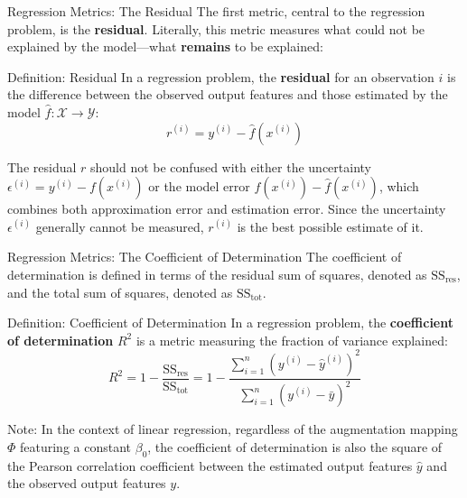 \begin{frame}{Regression Metrics: The Residual}
	The first metric, central to the regression problem, is the \textbf{residual}. Literally, this metric measures what could not be explained by the model—what \textbf{remains} to be explained:
	\begin{block}{Definition: Residual}
		In a regression problem, the \textbf{residual} for an observation $i$ is the difference between the observed output features and those estimated by the model $\hat{f}: \mathcal{X} \to \mathcal{Y}$:
		\begin{equation}
			r^{(i)} = y^{(i)} - \hat{f}(x^{(i)})
			\nonumber
		\end{equation}
	\end{block}
	\pause
	The residual $r$ should not be confused with either the uncertainty $\epsilon^{(i)} = y^{(i)} - f(x^{(i)})$ or the model error $f(x^{(i)}) - \hat{f}(x^{(i)})$, which combines both approximation error and estimation error. Since the uncertainty $\epsilon^{(i)}$ generally cannot be measured, $r^{(i)}$ is the best possible estimate of it.
\end{frame}

\begin{frame}{Regression Metrics: The Coefficient of Determination}
	The coefficient of determination is defined in terms of the residual sum of squares, denoted as $\text{SS}_{\text{res}}$, and the total sum of squares, denoted as $\text{SS}_{\text{tot}}$.
	\begin{block}{Definition: Coefficient of Determination}
		In a regression problem, the \textbf{coefficient of determination} $R^2$ is a metric measuring the fraction of variance explained:
		\begin{equation}
			R^2 = 1 - \frac{\text{SS}_{\text{res}}}{\text{SS}_{\text{tot}}} = 1 - \frac{\sum_{i=1}^n \left(y^{(i)} - \hat{y}^{(i)}\right)^2}{\sum_{i=1}^n \left(y^{(i)} - \bar{y}\right)^2}
			\nonumber
		\end{equation}
	\end{block}
	\pause
	Note: In the context of linear regression, regardless of the augmentation mapping $\Phi$ featuring a constant $\beta_0$, the coefficient of determination is also the square of the Pearson correlation coefficient between the estimated output features $\hat{y}$ and the observed output features $y$.
\end{frame}
			
